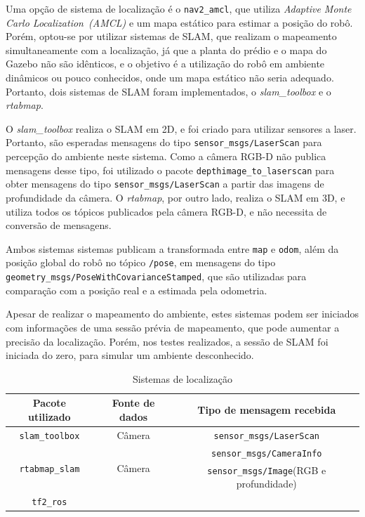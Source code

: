 \documentclass[repeatfields,xlists,xpacks,oneside,yearsonly]{ufrgscca}
\begin{document}

Uma opção de sistema de localização é o \texttt{nav2\_amcl}, que utiliza
\textit{Adaptive Monte Carlo Localization~(AMCL)} e um mapa estático para 
estimar a posição do robô.
Porém, optou-se por utilizar sistemas de SLAM, que realizam
o mapeamento simultaneamente com a localização, já que a planta 
do prédio e o mapa do Gazebo não são idênticos, e o objetivo é a utilização do
robô em ambiente dinâmicos ou pouco conhecidos, onde um mapa estático não seria 
adequado. Portanto, dois sistemas de SLAM foram implementados, 
o \textit{slam\_toolbox} e o \textit{rtabmap}.

O \textit{slam\_toolbox} realiza o SLAM em 2D, e foi criado para utilizar sensores
a laser. Portanto, são esperadas mensagens do tipo \texttt{sensor\_msgs/LaserScan}
para percepção do ambiente neste sistema. Como a câmera RGB-D não publica mensagens 
desse tipo, foi utilizado o pacote \texttt{depthimage\_to\_laserscan} para obter
mensagens do tipo \texttt{sensor\_msgs/LaserScan} a partir das imagens de profundidade
da câmera.
O \textit{rtabmap}, por outro lado, realiza o SLAM em 3D, e utiliza todos os
tópicos publicados pela câmera RGB-D, e não necessita de conversão de mensagens.

Ambos sistemas sistemas publicam a transformada entre \texttt{map} e \texttt{odom},
além da posição global do robô no tópico \texttt{/pose}, em mensagens do tipo 
\texttt{geometry\_msgs/PoseWithCovarianceStamped}, que são utilizadas para 
comparação com a posição real e a estimada pela odometria.

Apesar de realizar o mapeamento do ambiente, estes sistemas podem ser iniciados
com informações de uma sessão prévia de mapeamento, que pode aumentar
a precisão da localização. Porém, nos testes realizados, a sessão de SLAM
foi iniciada do zero, para simular um ambiente desconhecido.

\begin{table}[h]
    \begin{center}
        \caption{Sistemas de localização}
        \label{tab:localizacao}
        \begin{tabular}{c|c|c}
            Pacote utilizado & Fonte de dados & Tipo de mensagem recebida \\
            \hline
            \texttt{slam\_toolbox} & Câmera & \texttt{sensor\_msgs/LaserScan}\\ 
            \hline
            \multirow{2}{*}{\texttt{rtabmap\_slam}} & \multirow{2}{*}{Câmera} & \texttt{sensor\_msgs/CameraInfo} \\
                                                    &                               & \texttt{sensor\_msgs/Image}(RGB e profundidade) \\ 
            \hline
            \texttt{tf2\_ros} & &  \\
        \end{tabular}
    \end{center}
\end{table}
\end{document}
